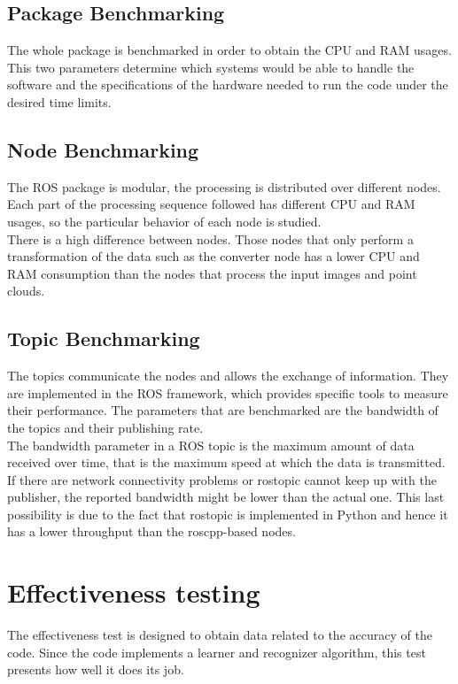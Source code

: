 \subsection{Package Benchmarking}
The whole package is benchmarked in order to obtain the CPU and RAM usages. This two parameters determine which systems would be able to handle the software and the specifications of the hardware needed to run the code under the desired time limits. 

\subsection{Node Benchmarking}
The ROS package is modular, the processing is distributed over different nodes. Each part of the processing sequence followed has different CPU and RAM usages, so the particular behavior of each node is studied. 
\\

There is a high difference between nodes. Those nodes that only perform a transformation of the data such as the converter node has a lower CPU and RAM consumption than the nodes that process the input images and point clouds. 

\subsection{Topic Benchmarking}
The topics communicate the nodes and allows the exchange of information. They are implemented in the ROS framework, which provides specific tools to measure their performance.
The parameters that are benchmarked are the bandwidth of the topics and their publishing rate.\\

The bandwidth parameter in a ROS topic is the maximum amount of data received over time, that is the maximum speed at which the data is transmitted. If there are network connectivity problems or rostopic cannot keep up with the publisher, the reported bandwidth might be lower than the actual one. This last possibility is due to the fact that rostopic is implemented in Python and hence it has a lower throughput than the roscpp-based nodes. 



\section{Effectiveness testing}

	The effectiveness test is designed to obtain data related to the accuracy of the code. Since the code implements a learner and recognizer algorithm, this test presents how well it does its job. 
\\

